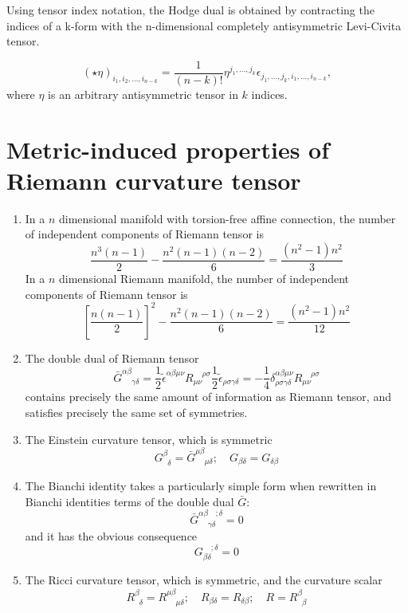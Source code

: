 \noindent
Using tensor index notation, the Hodge dual is obtained by contracting the indices of a k-form with the n-dimensional completely antisymmetric Levi-Civita tensor.

\begin{newprop}
\[(\star \eta )_{i_{1},i_{2},\ldots ,i_{n-k}}={\frac {1}{(n-k)!}}\eta ^{j_{1},\ldots ,j_{k}} \epsilon _{j_{1},\ldots ,j_{k},i_{1},\ldots ,i_{n-k}},\]
where $\eta$ is an arbitrary antisymmetric tensor in $k$ indices. 
\end{newprop}

\section{Metric-induced properties of Riemann curvature tensor}
\begin{enumerate}
\item In a $n$ dimensional manifold with torsion-free affine connection, the number of independent components of Riemann tensor is \[\frac{n^3(n-1)}{2} - \frac{n^2(n-1)(n-2)}{6} = \frac{(n^2-1)n^2}{3}\]
In a $n$ dimensional Riemann manifold,  the number of independent components of Riemann tensor is \[\left[\frac{n(n-1)}{2}\right]^2 -\frac{n^2(n-1)(n-2)}{6} = \frac{(n^2-1)n^2}{12} \]
\item  The double dual of Riemann tensor
\[\bar{G}^{\alpha \beta}_{\phantom{\alpha \beta} \gamma \delta} = \frac{1}{2} \tilde{\epsilon}^{\alpha \beta \mu \nu} R_{\mu \nu}^{\phantom{\mu \nu} \rho \sigma} \frac{1}{2} \tilde{\epsilon}_{\rho \sigma \gamma \delta} = -\frac{1}{4} \delta^{\alpha \beta \mu \nu}_{\rho \sigma \gamma \delta} R_{\mu \nu}^{\phantom{\mu \nu} \rho \sigma} \]
contains precisely the same amount of information as
Riemann tensor, and satisfies precisely the same set of symmetries.
\item The Einstein curvature tensor, which is symmetric
\[G^{\beta}_{\phantom{\beta}\delta} = \bar{G}^{\mu \beta}_{\phantom{\mu \beta} \mu \delta}; \quad G_{\beta \delta}=G_{\delta \beta}\]
\item The Bianchi identity takes a particularly simple form when rewritten in Bianchi identities terms of the double dual $\bar{G}$:
\[\bar{G}^{\alpha \beta \phantom{\gamma \delta};\delta}_{\phantom{\alpha \beta} \gamma \delta} = 0\]
and it has the obvious consequence
\[G_{\beta \delta}^{\phantom{\beta \delta};\delta} = 0\]
\item The Ricci curvature tensor, which is symmetric, and the curvature scalar
\[R^{\beta}_{\phantom{\beta}\delta} = R^{\mu \beta}_{\phantom{\mu \beta} \mu \delta}; \quad R_{\beta \delta}=R_{\delta \beta};\quad R = R^{\beta}_{\phantom{\beta}\beta}\]

\end{enumerate}
